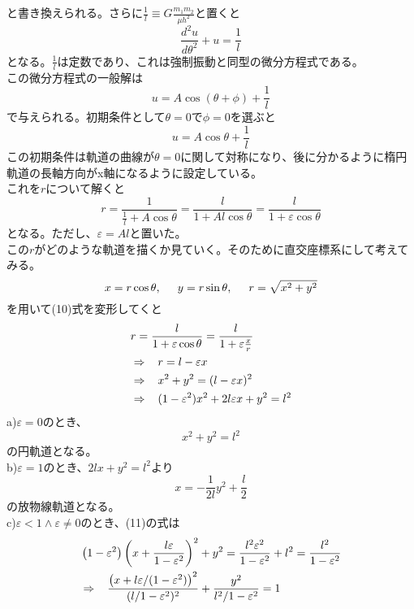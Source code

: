 \documentclass{jsarticle}
\begin{document}
と書き換えられる。さらに\(\displaystyle\frac{1}{l}\equiv G\frac{m_{1}m_{2}}{\mu h^{2}}\)と置くと
\begin{equation}
\frac{d^{2}u}{d\theta^{2}}+u=\frac{1}{l}
\end{equation}
となる。\(\displaystyle\frac{1}{l}\)は定数であり、これは強制振動と同型の微分方程式である。\\
この微分方程式の一般解は
\[u=A\cos(\theta+\phi)+\frac{1}{l}\]
で与えられる。初期条件として\(\theta=0\)で\(\phi=0\)を選ぶと
\begin{equation}
u=A\cos\theta + \frac{1}{l}
\end{equation}
この初期条件は軌道の曲線が\(\theta=0\)に関して対称になり、後に分かるように楕円軌道の長軸方向がx軸になるように設定している。\\
これを\(r\)について解くと
\begin{equation}
r=\frac{1}{\frac{1}{l}+A\cos\theta}=\frac{l}{1+Al\cos\theta}=\frac{l}{1+\varepsilon\cos\theta}
\end{equation}
となる。ただし、\(\varepsilon=Al\)と置いた。\\
この\(r\)がどのような軌道を描くか見ていく。そのために直交座標系にして考えてみる。
\[x=r\cos\theta,\hspace{5mm}y=r\sin\theta,\hspace{5mm}r=\sqrt{x^{2}+y^{2}}\]
を用いて(10)式を変形してくと
\begin{align}
&r=\frac{l}{1+\varepsilon\cos\theta}=\frac{l}{1+\varepsilon\frac{x}{r}}\nonumber\\
&\Rightarrow\hspace{3mm}r=l-\varepsilon x\nonumber\\
&\Rightarrow\hspace{3mm}x^{2}+y^{2}=(l-\varepsilon x)^{2}\nonumber\\
&\Rightarrow\hspace{3mm}(1-\varepsilon^{2})x^{2}+2l\varepsilon x+y^{2}=l^{2}
\end{align}
a)\hspace{3mm}\(\varepsilon=0\)のとき、
\[x^{2}+y^{2}=l^{2}\]
の円軌道となる。\\
b)\hspace{3mm}\(\varepsilon=1\)のとき、\(2lx+y^{2}=l^{2}\)より
\[x=-\frac{1}{2l}y^{2}+\frac{l}{2}\]
の放物線軌道となる。\\
c)\hspace{3mm}\(\varepsilon<1\land\varepsilon\neq0\)のとき、(11)の式は
\begin{align*}
&\left(1-\varepsilon^{2}\right)\left(x+\frac{l\varepsilon}{1-\varepsilon^{2}}\right)^{2}+y^{2}=\frac{l^{2}\varepsilon^{2}}{1-\varepsilon^{2}}+l^{2}=\frac{l^{2}}{1-\varepsilon^{2}}\\
&\Rightarrow\hspace{3mm}\frac{\left(x+l\varepsilon/(1-\varepsilon^{2})\right)^{2}}{(l/1-\varepsilon^{2})^{2}}+\frac{y^{2}}{l^{2}/1-\varepsilon^{2}}=1
\end{align*}
\end{document}
